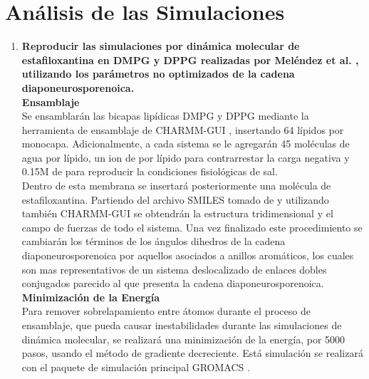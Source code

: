 \section{An\'{a}lisis de las Simulaciones}
\begin{enumerate}
\item \textbf{Reproducir las simulaciones por din\'{a}mica molecular de estafiloxantina en DMPG y DPPG realizadas  por Mel\'{e}ndez et al. \cite{MelendezDelgado2018StudyingBilayers}, utilizando los par\'{a}metros no optimizados de la cadena diaponeurosporenoica.}\label{item:1}\\

\textbf{Ensamblaje}\\
Se ensamblar\'{a}n las bicapas lip\'{i}dicas DMPG y DPPG mediante la herramienta de ensamblaje de CHARMM-GUI \cite{Sunhwan2008CHARMM-GUI:CHARMM}, insertando 64 l\'{i}pidos por monocapa. Adicionalmente, a cada sistema se le agregar\'{a}n 45 mol\'{e}culas de agua por l\'{i}pido,  un ion de  por l\'{i}pido  para contrarrestar la carga negativa y 0.15M de  para reproducir la condiciones fisiol\'{o}gicas de sal.\\
Dentro de esta membrana se insertar\'{a} posteriormente una mol\'{e}cula de estafiloxantina. Partiendo del archivo SMILES tomado de \cite{NationalCenterforBiotechnologyInformationPubChemCID=24892781} y utilizando tambi\'{e}n CHARMM-GUI se obtendr\'{a}n la estructura tridimensional y el campo de fuerzas de todo el sistema. Una vez finalizado este procedimiento se cambiar\'{a}n los t\'{e}rminos de los \'{a}ngulos dihedros  de la cadena diaponeurosporenoica por aquellos asociados a anillos arom\'{a}ticos, los cuales son mas representativos de un sistema deslocalizado de enlaces dobles conjugados parecido al que presenta la cadena diaponeurosporenoica.\\
\textbf{Minimizaci\'{o}n de la Energ\'{i}a}\\
Para remover sobrelapamiento entre \'{a}tomos durante el proceso de ensamblaje, que pueda causar inestabilidades durante las simulaciones de din\'{a}mica molecular, se realizar\'{a} una minimizaci\'{o}n de la energ\'{i}a, por 5000 pasos, usando el m\'{e}todo de gradiente decreciente. Est\'{a} simulaci\'{o}n se realizar\'{a} con el paquete de simulaci\'{o}n principal GROMACS \cite{AbrahamGROMACS2019}.\\


\end{enumerate}
